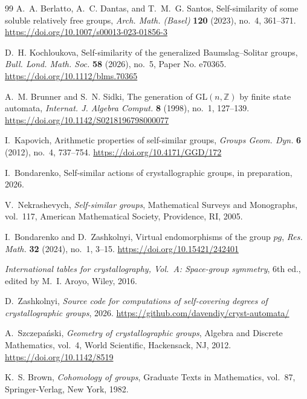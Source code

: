 \documentclass[draft]{adm-paper}
\theoremstyle{definition}
\begin{document}
\begin{thebibliography}{99}
  A.~A. Berlatto, A.~C. Dantas, and T.~M.~G. Santos,
  Self-similarity of some soluble relatively free groups,
  \emph{Arch. Math. (Basel)} \textbf{120} (2023), no.~4, 361--371.
  \url{https://doi.org/10.1007/s00013-023-01856-3}

  D.~H. Kochloukova,
  Self-similarity of the generalized Baumslag--Solitar groups,
  \emph{Bull. Lond. Math. Soc.} \textbf{58} (2026), no.~5, Paper No. e70365.
  \url{https://doi.org/10.1112/blms.70365}

  A.~M. Brunner and S.~N. Sidki,
  The generation of $\mathrm{GL}(n,\mathbb{Z})$ by finite state automata,
  \emph{Internat. J. Algebra Comput.} \textbf{8} (1998), no.~1, 127--139.
  \url{https://doi.org/10.1142/S0218196798000077}

  I.~Kapovich,
  Arithmetic properties of self-similar groups,
  \emph{Groups Geom. Dyn.} \textbf{6} (2012), no.~4, 737--754.
  \url{https://doi.org/10.4171/GGD/172}

  I.~Bondarenko,
  Self-similar actions of crystallographic groups,
  in preparation, 2026.

  V.~Nekrashevych,
  \emph{Self-similar groups},
  Mathematical Surveys and Monographs, vol.~117,
  American Mathematical Society, Providence, RI, 2005.

  I.~Bondarenko and D.~Zashkolnyi,
  Virtual endomorphisms of the group $pg$,
  \emph{Res. Math.} \textbf{32} (2024), no.~1, 3--15.
  \url{https://doi.org/10.15421/242401}

  \emph{International tables for crystallography, Vol.~A: Space-group symmetry},
  6th ed., edited by M.~I. Aroyo, Wiley, 2016.

  D.~Zashkolnyi,
  \emph{Source code for computations of self-covering degrees of crystallographic groups},
  2026.
  \url{https://github.com/davendiy/cryst-automata/}

  A.~Szczepa\'nski,
  \emph{Geometry of crystallographic groups},
  Algebra and Discrete Mathematics, vol.~4, World Scientific, Hackensack, NJ, 2012.
  \url{https://doi.org/10.1142/8519}

  K.~S. Brown,
  \emph{Cohomology of groups},
  Graduate Texts in Mathematics, vol.~87, Springer-Verlag, New York, 1982.


\end{thebibliography}
\end{document}
